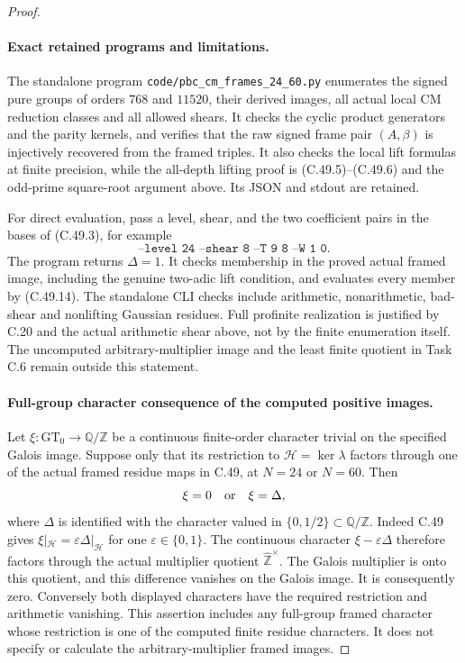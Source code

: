 \begin{proof}
\paragraph{Exact retained programs and limitations.}
The standalone program \texttt{code/pbc\_cm\_frames\_24\_60.py}
enumerates the signed pure groups of orders $768$ and $11520$,
their derived images, all actual local CM reduction classes and all
allowed shears. It checks the cyclic product generators and the
parity kernels, and verifies that the raw signed frame pair
$(A,\beta)$ is injectively recovered from the framed triples.
It also checks the local lift formulas at finite precision, while
the all-depth lifting proof is (C.49.5)--(C.49.6) and the odd-prime
square-root argument above. Its JSON and stdout are retained.

For direct evaluation, pass a level, shear, and the two coefficient
pairs in the bases of (C.49.3), for example
\[
 \texttt{--level 24 --shear 8 --T 9 8 --W 1 0}.
\]
The program returns $\Delta=1$. It checks membership in the proved
actual framed image, including the genuine two-adic lift condition,
and evaluates every member by (C.49.14). The standalone CLI checks
include arithmetic, nonarithmetic, bad-shear and nonlifting Gaussian
residues. Full profinite realization is justified by C.20 and the
actual arithmetic shear above, not by the finite enumeration itself.
The uncomputed arbitrary-multiplier image and the least finite
quotient in Task C.6 remain outside this statement.
\paragraph{Full-group character consequence of the computed positive images.}
Let $\xi:\widehat{\mathrm{GT}}_0\to\mathbb Q/\mathbb Z$ be a
continuous finite-order character trivial on the specified Galois
image. Suppose only that its restriction to
$\mathcal H=\ker\lambda$ factors through one of the actual framed
residue maps in C.49, at $N=24$ or $N=60$. Then
\[
                           \xi=0\quad\hbox{or}\quad\xi=\Delta,
\]
where $\Delta$ is identified with the character valued in
$\{0,1/2\}\subset\mathbb Q/\mathbb Z$.
Indeed C.49 gives $\xi|_{\mathcal H}=\varepsilon\Delta|_{\mathcal H}$
for one $\varepsilon\in\{0,1\}$. The continuous character
$\xi-\varepsilon\Delta$ therefore factors through the actual
multiplier quotient $\widehat{\mathbb Z}^{\times}$. The Galois
multiplier is onto this quotient, and this difference vanishes on
the Galois image. It is consequently zero. Conversely both displayed
characters have the required restriction and arithmetic vanishing.
This assertion includes any full-group framed character whose
restriction is one of the computed finite residue characters. It does
not specify or calculate the arbitrary-multiplier framed images.
\end{proof}

